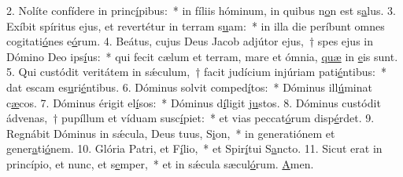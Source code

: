 2. Nolíte confídere in princ\uline{í}pibus:~* in fíliis hóminum, in quibus n\uline{o}n est s\uline{a}lus.
3. Exíbit spíritus ejus, et revertétur in terram s\uline{u}am:~* in illa die períbunt omnes cogitati\uline{ó}nes e\uline{ó}rum.
4. Beátus, cujus Deus Jacob adjútor ejus,~† spes ejus in Dómino Deo ips\uline{í}us:~* qui fecit cælum et terram, mare et ómnia, \uline{quæ} in \uline{e}is sunt.
5. Qui custódit veritátem in sǽculum,~† facit judícium injúriam pati\uline{é}ntibus:~* dat escam es\uline{u}ri\uline{é}ntibus.
6. Dóminus solvit comped\uline{í}tos:~* Dóminus ill\uline{ú}minat c\uline{æ}cos.
7. Dóminus érigit el\uline{í}sos:~* Dóminus d\uline{í}ligit j\uline{u}stos.
8. Dóminus custódit ádvenas,~† pupíllum et víduam susc\uline{í}piet:~* et vias peccat\uline{ó}rum disp\uline{é}rdet.
9. Regnábit Dóminus in sǽcula, Deus tuus, S\uline{i}on,~* in generatiónem et gener\uline{a}ti\uline{ó}nem.
10. Glória Patri, et F\uline{í}lio,~* et Spir\uline{í}tui S\uline{a}ncto.
11. Sicut erat in princípio, et nunc, et s\uline{e}mper,~* et in sǽcula sæcul\uline{ó}rum. \uline{A}men.

